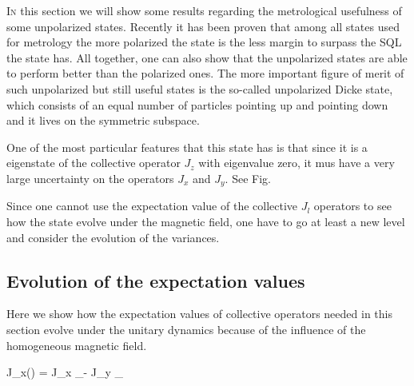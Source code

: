 \lettrine[lines=2, findent=3pt,nindent=0pt]{I}{n} this section we will show some results regarding the metrological usefulness of some unpolarized states.
Recently it has been proven that among all states used for metrology the more polarized the state is the less margin to surpass the SQL the state has.
All together, one can also show that the unpolarized states are able to perform better than the polarized ones.
The more important figure of merit of such unpolarized but still useful states is the so-called unpolarized Dicke state, which consists of an equal number of particles pointing up and pointing down and it lives on the symmetric subspace.

One of the most particular features that this state has is that since it is a eigenstate of the collective operator $J_z$ with eigenvalue zero, it mus have a very large uncertainty on the operators $J_x$ and $J_y$. See Fig.

Since one cannot use the expectation value of the collective $J_l$ operators to see how the state evolve under the magnetic field, one have to go at least a new level and consider the evolution of the variances.

\subsection{Evolution of the expectation values}
Here we show how the expectation values of collective operators needed in this section evolve under the unitary dynamics because of the influence of the homogeneous magnetic field.

\be
  J_x(\Theta) = J_x _\Theta - J_y _{\Theta}
\ee
